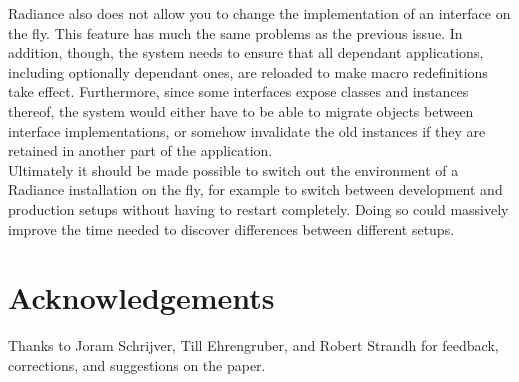 \documentclass{sig-alternate}
\begin{document}
Radiance also does not allow you to change the implementation of an interface on the fly. This feature has much the same problems as the previous issue. In addition, though, the system needs to ensure that all dependant applications, including optionally dependant ones, are reloaded to make macro redefinitions take effect. Furthermore, since some interfaces expose classes and instances thereof, the system would either have to be able to migrate objects between interface implementations, or somehow invalidate the old instances if they are retained in another part of the application. \\

Ultimately it should be made possible to switch out the environment of a Radiance installation on the fly, for example to switch between development and production setups without having to restart completely. Doing so could massively improve the time needed to discover differences between different setups.

\section{Acknowledgements}
Thanks to Joram Schrijver, Till Ehrengruber, and Robert Strandh for feedback, corrections, and suggestions on the paper.


\end{document}
